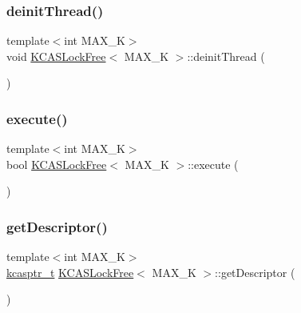 \mbox{\label{classKCASLockFree_a703c5cf96094b2e49c5e23f199292915}} 
\subsubsection{\texorpdfstring{deinit\+Thread()}{deinitThread()}}
{\footnotesize\ttfamily template$<$int M\+A\+X\+\_\+K$>$ \\
void \hyperlink{classKCASLockFree}{K\+C\+A\+S\+Lock\+Free}$<$ M\+A\+X\+\_\+K $>$\+::deinit\+Thread (\begin{DoxyParamCaption}{ }\end{DoxyParamCaption})}

\mbox{\label{classKCASLockFree_a68b4bbf1a5895cf96f7cddde59990e9e}} 
\subsubsection{\texorpdfstring{execute()}{execute()}}
{\footnotesize\ttfamily template$<$int M\+A\+X\+\_\+K$>$ \\
bool \hyperlink{classKCASLockFree}{K\+C\+A\+S\+Lock\+Free}$<$ M\+A\+X\+\_\+K $>$\+::execute (\begin{DoxyParamCaption}{ }\end{DoxyParamCaption})}

\mbox{\label{classKCASLockFree_a928a7be795b2fb894dd6ecf1be757d6e}} 
\subsubsection{\texorpdfstring{get\+Descriptor()}{getDescriptor()}}
{\footnotesize\ttfamily template$<$int M\+A\+X\+\_\+K$>$ \\
\hyperlink{kcas__reuse__impl_8h_a5bbc81d391bfd6b4288a0d33f105a0b2}{kcasptr\+\_\+t} \hyperlink{classKCASLockFree}{K\+C\+A\+S\+Lock\+Free}$<$ M\+A\+X\+\_\+K $>$\+::get\+Descriptor (\begin{DoxyParamCaption}{ }\end{DoxyParamCaption})}

